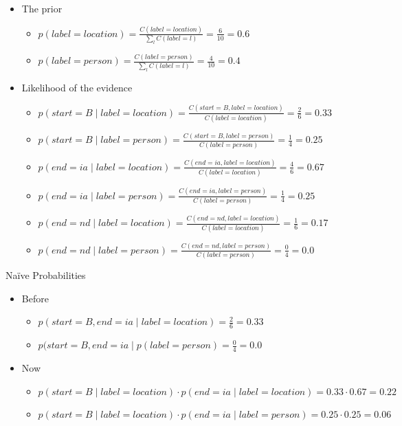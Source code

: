 \documentclass[11pt,letterpaper]{article}
\begin{document}
\begin{itemize}
  \item The prior
    \begin{itemize}
      \item $p(label=location) = \frac{C(label=location)}{\sum_l C(label=l)} = \frac{6}{10} = 0.6$
      \item $p(label=person) = \frac{C(label=person)}{\sum_l C(label=l)} = \frac{4}{10} = 0.4$
    \end{itemize}
  \item Likelihood of the evidence
    \begin{itemize}
      \item $p(start=B \mid label=location) = \frac{C(start=B, label=location)}{C(label=location)} = \frac{2}{6} = 0.33$
      \item $p(start=B \mid label=person) = \frac{C(start=B, label=person)}{C(label=person)} = \frac{1}{4} = 0.25$
      \\
      \item $p(end=ia \mid label=location) = \frac{C(end=ia, label=location)}{C(label=location)} = \frac{4}{6} = 0.67$
      \item $p(end=ia \mid label=person) = \frac{C(end=ia, label=person)}{C(label=person)} = \frac{1}{4} = 0.25$
      \\
      \item $p(end=nd \mid label=location) = \frac{C(end=nd, label=location)}{C(label=location)} = \frac{1}{6} = 0.17$
      \item $p(end=nd \mid label=person) = \frac{C(end=nd, label=person)}{C(label=person)} = \frac{0}{4} = 0.0$
    \end{itemize}
\end{itemize}


Na\"{i}ve Probabilities

\begin{itemize}
  \item Before
    \begin{itemize}
      \item $p(start=B, end=ia \mid label=location) = \frac{2}{6} = 0.33$
      \item $p(start=B, end=ia \mid p(label=person) = \frac{0}{4} = 0.0$
    \end{itemize}
  \item Now
    \begin{itemize}
      \item $p(start=B \mid label=location) \cdot p(end=ia \mid label=location) = 0.33 \cdot 0.67 = 0.22$
      \item $p(start=B \mid label=location) \cdot p(end=ia \mid label=person) = 0.25 \cdot 0.25 = 0.06$
    \end{itemize}
\end{itemize}
\end{document}
